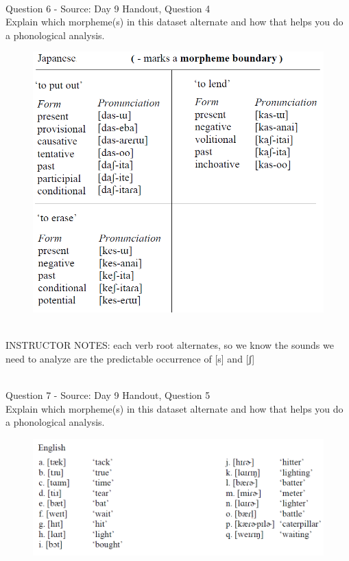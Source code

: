 \documentclass[12pt]{article}
\begin{document}
~\\

{\large Question 6} - Source: Day 9 Handout, Question 4\\

Explain which morpheme(s) in this dataset alternate and how that helps you do a phonological analysis.\\

\begin{figure}[H]
\includegraphics{../images/japanese_verbs.png}
\end{figure}

~\\
INSTRUCTOR NOTES: each verb root alternates, so we know the sounds we need to analyze are the predictable occurrence of [s] and [ʃ]


~\\

{\large Question 7} - Source: Day 9 Handout, Question 5\\

Explain which morpheme(s) in this dataset alternate and how that helps you do a phonological analysis.\\

\begin{figure}[H]
\includegraphics{../images/english_t_flap.png}
\end{figure}
\end{document}
